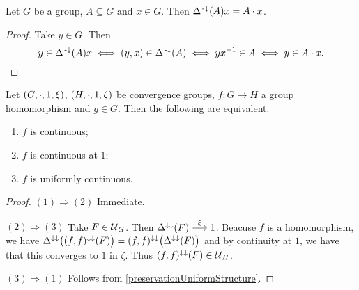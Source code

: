 \begin{lemma} \label{deltaPreimageLemma}
Let $G$ be a group, $A\subseteq G$ and $x\in G$. Then $\Delta^{{\text{\hspace{0.15em}-}\downarrow}}(A)x = A\cdot x$.
\end{lemma}
\begin{proof}
Take $y\in G$. Then
\[ y\in \Delta^{{\text{\hspace{0.15em}-}\downarrow}}(A)x \iff (y,x)\in \Delta^{{\text{\hspace{0.15em}-}\downarrow}}(A) \iff yx^{-1}\in A \iff y\in A\cdot x. \]
\end{proof}

\begin{proposition} \label{uniformContinuityGroupHomomorphism}
Let $\sSet{G, \cdot, 1, \xi}$, $\sSet{H, \cdot, 1, \zeta}$ be convergence groups, $f: G\to H$ a group homomorphism and $g\in G$. Then the following are equivalent:
\begin{enumerate}
\item $f$ is continuous;
\item $f$ is continuous at $1$;
\item $f$ is uniformly continuous.
\end{enumerate}
\end{proposition}
\begin{proof}
$(1)\Rightarrow (2)$ Immediate.

$(2)\Rightarrow (3)$ Take $F\in \operatorname{\mathcal{U}}_G$. Then $\Delta^{\downarrow\downarrow}(F)\overset{\xi}{\longrightarrow} 1$. Beacuse $f$ is a homomorphism, we have $\Delta^{\downarrow\downarrow}\big((f,f)^{\downarrow\downarrow}(F)\big) = (f,f)^{\downarrow\downarrow}\big(\Delta^{\downarrow\downarrow}(F)\big)$ and by continuity at $1$, we have that this converges to $1$ in $\zeta$. Thus $(f,f)^{\downarrow\downarrow}(F)\in \operatorname{\mathcal{U}}_H$.

$(3)\Rightarrow (1)$ Follows from \ref{preservationUniformStructure}.
\end{proof}

